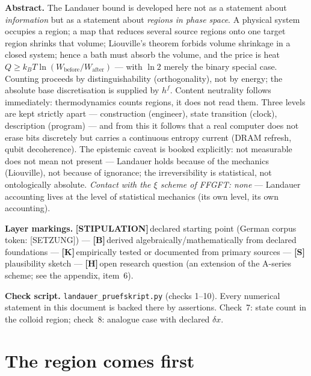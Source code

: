 \documentclass[11pt,a4paper]{article}
\newcommand{\LS}{\textcolor{laySet}{\textbf{\footnotesize\textsf{[STIPULATION]}}}\,}
\newcommand{\LK}{\textcolor{layK}{\textbf{\footnotesize\textsf{[K]}}}\,}
\newcommand{\LB}{\textcolor{layB}{\textbf{\footnotesize\textsf{[B]}}}\,}
\newcommand{\LSk}{\textcolor{layS}{\textbf{\footnotesize\textsf{[S]}}}\,}
\newcommand{\LH}{\textcolor{layH}{\textbf{\footnotesize\textsf{[H]}}}\,}
\begin{document}
\begingroup\small\noindent
\textbf{Abstract.} The Landauer bound is developed here not as a statement about
\emph{information} but as a statement about \emph{regions in phase space}. A
physical system occupies a region; a map that reduces several source regions onto
one target region shrinks that volume; Liouville's theorem forbids volume
shrinkage in a closed system; hence a bath must absorb the volume, and the price
is heat $Q \ge k_B T \ln(W_{\text{before}}/W_{\text{after}})$ --- with $\ln 2$
merely the binary special case. Counting proceeds by distinguishability
(orthogonality), not by energy; the absolute base discretisation is supplied by
$h^f$. Content neutrality follows immediately: thermodynamics counts regions, it
does not read them. Three levels are kept strictly apart --- construction
(engineer), state transition (clock), description (program) --- and from this it
follows that a real computer does not erase bits discretely but carries a
continuous entropy current (DRAM refresh, qubit decoherence). The epistemic caveat
is booked explicitly: not measurable does not mean not present --- Landauer holds
because of the mechanics (Liouville), not because of ignorance; the
irreversibility is statistical, not ontologically absolute. \emph{Contact with the
$\xi$ scheme of FFGFT: none} --- Landauer accounting lives at the level of
statistical mechanics (its own level, its own accounting).
\par\endgroup

\bigskip

\begingroup\small\noindent
\textbf{Layer markings.} \LS declared starting point (German corpus token:
[SETZUNG]) --- \LB derived algebraically/mathematically from declared foundations
--- \LK empirically tested or documented from primary sources --- \LSk
plausibility sketch --- \LH open research question (an extension of the A-series
scheme; see the appendix, item~6).
\par\endgroup

\bigskip

\begingroup\small\noindent
\textbf{Check script.} \texttt{landauer\_pruefskript.py} (checks 1--10). Every
numerical statement in this document is backed there by assertions. Check~7: state
count in the colloid region; check~8: analogue case with declared $\delta x$.
\par\endgroup

\bigskip

\section{The region comes first}
\end{document}
